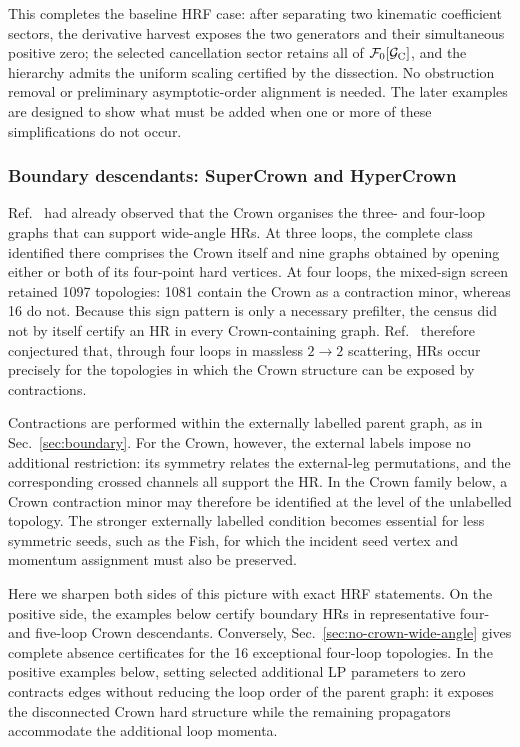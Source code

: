 \documentclass[a4paper,11pt]{article}
\begin{document}
This completes the baseline HRF case: after separating two kinematic
coefficient sectors, the derivative harvest exposes the two generators and
their simultaneous positive zero; the selected cancellation sector retains
all of \(\mathcal F_0[\mathcal G_{\rm C}]\), and the hierarchy admits the uniform scaling
certified by the dissection.  No obstruction removal or preliminary
asymptotic-order alignment is needed.  The later examples are designed to
show what must be added when one or more of these simplifications do not
occur.

\subsubsection{Boundary descendants: SuperCrown and HyperCrown}
\label{sec:example-crown-boundaries}

Ref.~\cite{Gardi:2024axt} had already observed that the Crown organises the
three- and four-loop graphs that can support wide-angle HRs.  At three loops,
the complete class identified there comprises the Crown itself and nine graphs
obtained by opening either or both of its four-point hard vertices.  At four
loops, the mixed-sign screen retained 1097 topologies: 1081 contain the Crown
as a contraction minor, whereas 16 do not.
Because this sign pattern is only
a necessary prefilter, the census did not by itself certify an HR in every
Crown-containing graph.  Ref.~\cite{Gardi:2024axt} therefore conjectured that,
through four loops in massless \(2\to2\) scattering, HRs occur precisely for
the topologies in which the Crown structure can be exposed by contractions.

Contractions are performed within the externally labelled parent graph, as in
Sec.~\ref{sec:boundary}.  For the Crown, however, the external labels impose no
additional restriction: its symmetry relates the external-leg permutations,
and the corresponding crossed channels all support the HR.  In the Crown
family below, a Crown contraction minor may therefore be identified at the
level of the unlabelled topology.  The stronger externally labelled condition
becomes essential for less symmetric seeds, such as the Fish, for which the
incident seed vertex and momentum assignment must also be preserved.

Here we sharpen both sides of this picture with exact HRF statements.  On the
positive side, the examples below certify boundary HRs in representative
four- and five-loop Crown descendants.  Conversely,
Sec.~\ref{sec:no-crown-wide-angle} gives complete absence certificates for
the 16 exceptional four-loop topologies.  In the positive examples below,
setting selected additional LP parameters to zero contracts edges without
reducing the loop order of the parent graph: it exposes the disconnected
Crown hard structure while the remaining propagators accommodate the
additional loop momenta.
\end{document}
